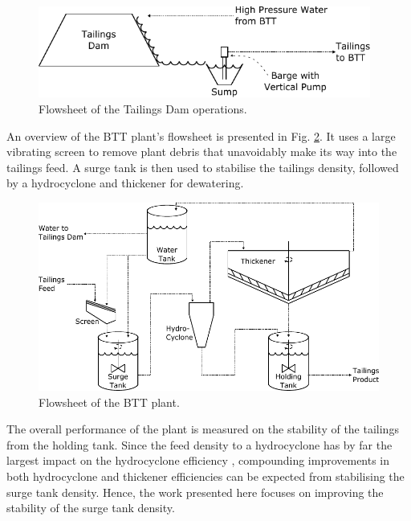 \documentclass[preprint,authoryear,12pt]{elsarticle}
\begin{document}
\begin{figure}[b!]
	\centering
	\includegraphics[width=4.3in]{TailingsDam.pdf}
	\caption{Flowsheet of the Tailings Dam operations.}
	\label{fig:TailingsDam}
\end{figure}

An overview of the BTT plant's flowsheet is presented in Fig. \ref{fig:BTTFlowSheet}. It uses a large vibrating screen to remove plant debris that unavoidably make its way into the tailings feed. A surge tank is then used to stabilise the tailings density, followed by a hydrocyclone and thickener for dewatering. 

\begin{figure}[b!]
	\centering
	\includegraphics[width=5.2in]{BTTDetailed.pdf}
	\caption{Flowsheet of the BTT plant.}
	\label{fig:BTTFlowSheet}
\end{figure}


The overall performance of the plant is measured on the stability of the tailings from the holding tank. Since the feed density to a hydrocyclone has by far the largest impact on the hydrocyclone efficiency \citep{Ntengwe2011}, compounding improvements in both hydrocyclone and thickener efficiencies can be expected from stabilising the surge tank density. Hence, the work presented here focuses on improving the stability of the surge tank density. 
\end{document}
